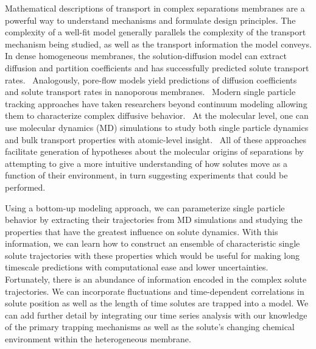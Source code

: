 \documentclass[aps,pre,preprint,groupedaddress,longbibliography]{revtex4-2}
\begin{document}
  Mathematical descriptions of transport in complex separations membranes are 
  a powerful way to understand mechanisms and formulate design principles. 
  \cite{vinh-thang_predictive_2013,geens_transport_2006,darvishmanesh_mass_2016}
  The complexity of a well-fit model generally parallels the complexity of the transport 
  mechanism being studied, as well as the transport information the model conveys.
  In dense homogeneous membranes, the solution-diffusion model can extract 
  diffusion and partition coefficients and has successfully predicted solute 
  transport rates.~\cite{wijmans_solution-diffusion_1995} Analogously, pore-flow
  models yield predictions of diffusion coefficients and solute transport rates 
  in nanoporous membranes.~\cite{paul_diffusive_1974} Modern single particle 
  tracking approaches have taken researchers beyond continuum modeling allowing them to 
  characterize complex diffusive behavior.~\cite{manzo_review_2015} At the molecular
  level, one can use molecular dynamics (MD) simulations to study both single 
  particle dynamics and bulk transport properties with atomic-level insight.~\cite{coscia_chemically_2019,maginn_best_2018}
  All of these approaches facilitate generation of hypotheses about the
  molecular origins of separations by attempting to give a more intuitive 
  understanding of how solutes move as a function of their environment, in turn
  suggesting experiments that could be performed.

  Using a bottom-up modeling approach, we can parameterize single particle behavior
  by extracting their trajectories from MD simulations and studying the properties that
  have the greatest influence on solute dynamics. With this information, we can learn
  how to construct an ensemble of characteristic single solute trajectories with these
  properties which would be useful for making long timescale predictions with computational
  ease and lower uncertainties. Fortunately, there is an abundance of information encoded
  in the complex solute trajectories. We can incorporate fluctuations and time-dependent 
  correlations in solute position as well as the length of time solutes are trapped into a
  model. We can add further detail by integrating our time series analysis with our 
  knowledge of the primary trapping mechanisms as well as the solute's changing chemical
  environment within the heterogeneous membrane. 

  
\end{document}
